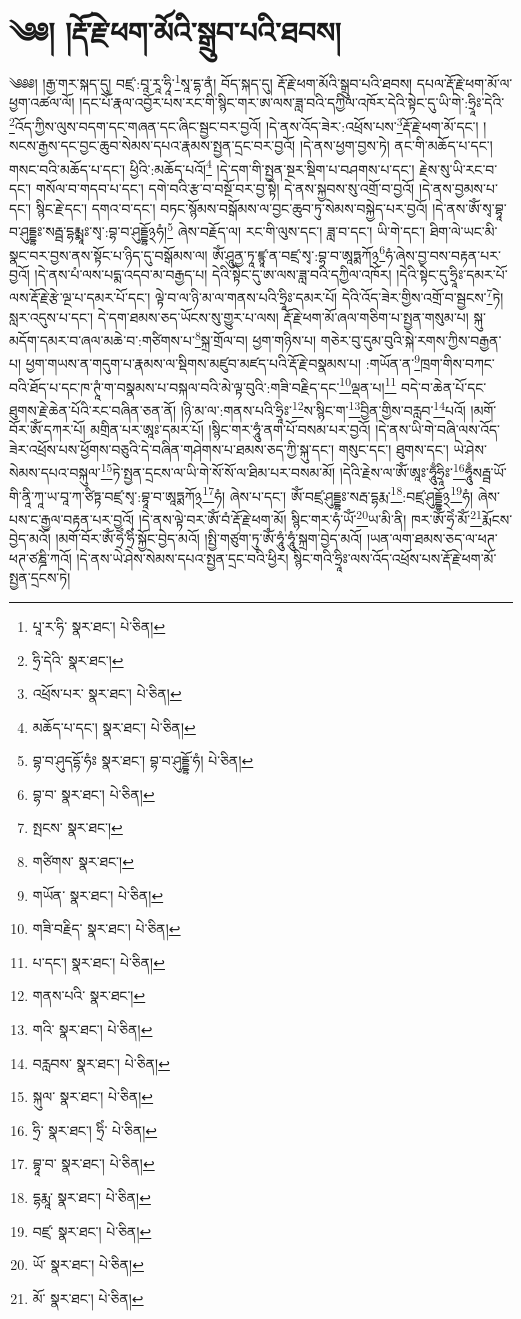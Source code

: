 \setcounter{footnote}{0} 
\chapter{༄༅། །རྡོ་རྗེ་ཕག་མོའི་སྒྲུབ་པའི་ཐབས།}༄༅༅། །རྒྱ་གར་སྐད་དུ། བཛྲ་:བཱ་རཱ་ཧཱི་\footnote{པཱ་ར་ཧི་  སྣར་ཐང་།  པེ་ཅིན། }སཱ་དྷ་ནཾ། བོད་སྐད་དུ། རྡོ་རྗེ་ཕག་མོའི་སྒྲུབ་པའི་ཐབས། དཔལ་རྡོ་རྗེ་ཕག་མོ་ལ་ཕྱག་འཚལ་ལོ། །དང་པོ་རྣལ་འབྱོར་པས་རང་གི་སྙིང་གར་ཨ་ལས་ཟླ་བའི་དཀྱིལ་འཁོར་དེའི་སྟེང་དུ་ཡི་གེ་:ཧྲཱིཿ་དེའི་\footnote{ཧྲི་དེའི་  སྣར་ཐང་། }འོད་ཀྱིས་ལུས་བདག་དང་གཞན་དང་ཞིང་སྦྱང་བར་བྱའོ། །དེ་ནས་འོད་ཟེར་:འཕྲོས་པས་\footnote{འཕྲོས་པར་  སྣར་ཐང་།  པེ་ཅིན། }རྡོ་རྗེ་ཕག་མོ་དང་། །སངས་རྒྱས་དང་བྱང་ཆུབ་སེམས་དཔའ་རྣམས་སྤྱན་དྲང་བར་བྱའོ། །དེ་ནས་ཕྱག་བྱས་ཏེ། ནང་གི་མཆོད་པ་དང་། གསང་བའི་མཆོད་པ་དང་། ཕྱིའི་:མཆོད་པའོ།\footnote{མཆོད་པ་དང་།  སྣར་ཐང་།  པེ་ཅིན། } །དེ་དག་གི་སྤྱན་སྔར་སྡིག་པ་བཤགས་པ་དང་། རྗེས་སུ་ཡི་རང་བ་དང་། གསོལ་བ་གདབ་པ་དང་། དགེ་བའི་རྩ་བ་བསྔོ་བར་བྱ་སྟེ། དེ་ནས་སྐྱབས་སུ་འགྲོ་བ་བྱའོ། །དེ་ནས་བྱམས་པ་དང་། སྙིང་རྗེ་དང་། དགའ་བ་དང་། བཏང་སྙོམས་བསྒོམས་ལ་བྱང་ཆུབ་ཏུ་སེམས་བསྐྱེད་པར་བྱའོ། །དེ་ནས་ཨོཾ་སྭ་བྷཱ་བ་ཤུདྡྷཿ་སརྦྦ་དྷརྨྨཱཿ་སྭ་:བྷ་བ་ཤུདྡྷོ྅ཧཾ།\footnote{བྷ་བ་ཤུདདྷོ་ཧཾཿ  སྣར་ཐང་། བྷ་བ་ཤུདྡྷོ་ཧཾ།  པེ་ཅིན། } ཞེས་བརྗོད་ལ། རང་གི་ལུས་དང་། ཟླ་བ་དང་། ཡི་གེ་དང་། ཐིག་ལེ་ཡང་མི་སྣང་བར་བྱས་ནས་སྟོང་པ་ཉིད་དུ་བསྒོམས་ལ། ཨོཾ་ཤཱུནྱ་ཏཱ་ཛྙཱ་ན་བཛྲ་སྭ་:བྷ་བ་ཨཱཏྨཀོ྅\footnote{བྷ་བ་  སྣར་ཐང་།  པེ་ཅིན། }ཧཾ་ཞེས་བྱ་བས་བརྟན་པར་བྱའོ། །དེ་ནས་པཾ་ལས་པདྨ་འདབ་མ་བརྒྱད་པ། དེའི་སྟེང་དུ་ཨ་ལས་ཟླ་བའི་དཀྱིལ་འཁོར། །དེའི་སྟེང་དུ་ཧྲཱིཿ་དམར་པོ་ལས་རྡོ་རྗེ་རྩེ་ལྔ་པ་དམར་པོ་དང་། ལྟེ་བ་ལ་ཉི་མ་ལ་གནས་པའི་ཧྲཱིཿ་དམར་པོ། དེའི་འོད་ཟེར་གྱིས་འགྲོ་བ་སྦྱངས་\footnote{སྤངས་  སྣར་ཐང་། }ཏེ། སླར་འདུས་པ་དང་། དེ་དག་ཐམས་ཅད་ཡོངས་སུ་གྱུར་པ་ལས། རྡོ་རྗེ་ཕག་མོ་ཞལ་གཅིག་པ་སྤྱན་གསུམ་པ། སྐུ་མདོག་དམར་བ་ཞལ་མཆེ་བ་:གཙིགས་པ་\footnote{གཙིགས་  སྣར་ཐང་། }སྐྲ་གྲོལ་བ། ཕྱག་གཉིས་པ། གཅེར་བུ་དུམ་བུའི་སྐེ་རགས་ཀྱིས་བརྒྱན་པ། ཕྱག་གཡས་ན་གདུག་པ་རྣམས་ལ་སྡིགས་མཛུབ་མཛད་པའི་རྡོ་རྗེ་བསྣམས་པ། :གཡོན་ན་\footnote{གཡོན་  སྣར་ཐང་།  པེ་ཅིན། }ཁྲག་གིས་བཀང་བའི་ཐོད་པ་དང་ཁ་ཊཱཾ་ག་བསྣམས་པ་བསྐལ་བའི་མེ་ལྟ་བུའི་:གཟི་བརྗིད་དང་\footnote{གཟི་བརྗིད་  སྣར་ཐང་།  པེ་ཅིན། }ལྡན་པ།\footnote{པ་དང་།  སྣར་ཐང་།  པེ་ཅིན། } བདེ་བ་ཆེན་པོ་དང་ཐུགས་རྗེ་ཆེན་པོའི་རང་བཞིན་ཅན་ནོ། །ཉི་མ་ལ་:གནས་པའི་ཧྲཱིཿ་\footnote{གནས་པའི་  སྣར་ཐང་། }ས་སྙིང་ག་\footnote{གའི་  སྣར་ཐང་།  པེ་ཅིན། }བྱིན་གྱིས་བརླབ་\footnote{བརླབས་  སྣར་ཐང་།  པེ་ཅིན། }པའོ། །མགོ་བོར་ཨོཾ་དཀར་པོ། མགྲིན་པར་ཨཱཿ་དམར་པོ། །སྙིང་གར་ཧཱུཾ་ནག་པོ་བསམ་པར་བྱའོ། །དེ་ནས་ཡི་གེ་བཞི་ལས་འོད་ཟེར་འཕྲོས་པས་ཕྱོགས་བཅུའི་དེ་བཞིན་གཤེགས་པ་ཐམས་ཅད་ཀྱི་སྐུ་དང་། གསུང་དང་། ཐུགས་དང་། ཡེ་ཤེས་སེམས་དཔའ་བསྐུལ་\footnote{སྐུལ་  སྣར་ཐང་།  པེ་ཅིན། }ཏེ་སྤྱན་དྲངས་ལ་ཡི་གེ་སོ་སོ་ལ་ཐིམ་པར་བསམ་མོ། །དེའི་རྗེས་ལ་ཨོཾ་ཨཱཿ་ཧཱུྃཧྲཱིཿ་\footnote{ཧྲི་  སྣར་ཐང་། ཧྲིཾ་  པེ་ཅིན། }ཧཱུྃསརྦྦ་ཡོ་གི་ནཱི་ཀཱ་ཡ་བཱ་ཀ་ཙིཏྟ་བཛྲ་སྭ་:བྷཱ་བ་ཨཱཏྨཀོ྅\footnote{བྷཱ་བ་  སྣར་ཐང་།  པེ་ཅིན། }ཧཾ། ཞེས་པ་དང་། ཨོཾ་བཛྲ་ཤུདྡྷཿ་སརྦ་དྷརྨ་\footnote{དྷརྨཱ་  སྣར་ཐང་།  པེ་ཅིན། }:བཛྲ་ཤུདྡྷོ྅\footnote{བཛྲ་  སྣར་ཐང་།  པེ་ཅིན། }ཧཾ། ཞེས་པས་ང་རྒྱལ་བརྟན་པར་བྱའོ། །དེ་ནས་ལྟེ་བར་ཨོཾ་བཾ་རྡོ་རྗེ་ཕག་མོ། སྙིང་གར་ཧཾ་ཡོཾ་\footnote{ཡོ་  སྣར་ཐང་།  པེ་ཅིན། }ཡ་མི་ནི། ཁར་ཨོཾ་ཧྲེཾ་མོཾ་\footnote{མོ་  སྣར་ཐང་།  པེ་ཅིན། }རྨོངས་བྱེད་མའོ། །མགོ་བོར་ཨོཾ་ཧྲེཾ་ཧྲིཾ་སྐྱོང་བྱེད་མའོ། །སྤྱི་གཙུག་ཏུ་ཨོཾ་ཧཱུཾ་ཧཱུཾ་སྐྲག་བྱེད་མའོ། །ཡན་ལག་ཐམས་ཅད་ལ་ཕཊ་ཕཊ་ཙཎྜི་ཀའོ། །དེ་ནས་ཡེ་ཤེས་སེམས་དཔའ་སྤྱན་དྲང་བའི་ཕྱིར། སྙིང་གའི་ཧྲཱིཿ་ལས་འོད་འཕྲོས་པས་རྡོ་རྗེ་ཕག་མོ་སྤྱན་དྲངས་ཏེ། 